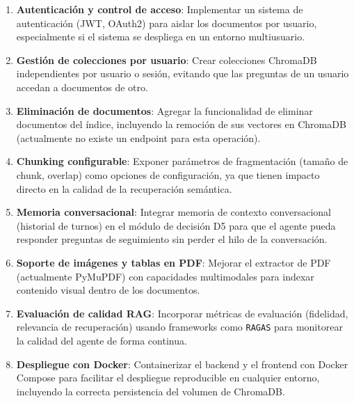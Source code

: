 \documentclass[12pt,a4paper]{article}
\begin{document}
\begin{enumerate}[leftmargin=1.5cm]
  \item \textbf{Autenticación y control de acceso}: Implementar un sistema de autenticación (JWT, OAuth2) para aislar los documentos por usuario, especialmente si el sistema se despliega en un entorno multiusuario.

  \item \textbf{Gestión de colecciones por usuario}: Crear colecciones ChromaDB independientes por usuario o sesión, evitando que las preguntas de un usuario accedan a documentos de otro.

  \item \textbf{Eliminación de documentos}: Agregar la funcionalidad de eliminar documentos del índice, incluyendo la remoción de sus vectores en ChromaDB (actualmente no existe un endpoint para esta operación).

  \item \textbf{Chunking configurable}: Exponer parámetros de fragmentación (tamaño de chunk, overlap) como opciones de configuración, ya que tienen impacto directo en la calidad de la recuperación semántica.

  \item \textbf{Memoria conversacional}: Integrar memoria de contexto conversacional (historial de turnos) en el módulo de decisión D5 para que el agente pueda responder preguntas de seguimiento sin perder el hilo de la conversación.

  \item \textbf{Soporte de imágenes y tablas en PDF}: Mejorar el extractor de PDF (actualmente PyMuPDF) con capacidades multimodales para indexar contenido visual dentro de los documentos.

  \item \textbf{Evaluación de calidad RAG}: Incorporar métricas de evaluación (fidelidad, relevancia de recuperación) usando frameworks como \texttt{RAGAS} para monitorear la calidad del agente de forma continua.

  \item \textbf{Despliegue con Docker}: Containerizar el backend y el frontend con Docker Compose para facilitar el despliegue reproducible en cualquier entorno, incluyendo la correcta persistencia del volumen de ChromaDB.
\end{enumerate}

\end{document}
